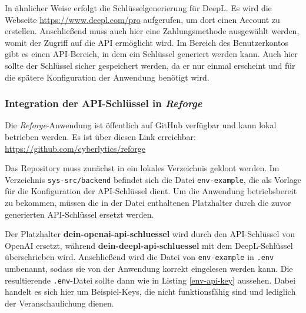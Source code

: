 In ähnlicher Weise erfolgt die Schlüsselgenerierung für DeepL. Es wird die Webseite \href{https://www.deepl.com/pro}{https://www.deepl.com/pro} aufgerufen, um dort einen Account zu erstellen. Anschließend muss auch hier eine Zahlungsmethode ausgewählt werden, womit der Zugriff auf die \ac{API} ermöglicht wird. Im Bereich des Benutzerkontos gibt es einen \ac{API}-Bereich, in dem ein Schlüssel generiert werden kann. Auch hier sollte der Schlüssel sicher gespeichert werden, da er nur einmal erscheint und für die spätere Konfiguration der Anwendung benötigt wird.

\subsubsection{Integration der \ac{API}-Schlüssel in \textit{Reforge}}

Die \textit{Reforge}-Anwendung ist öffentlich auf GitHub verfügbar und kann lokal betrieben werden. Es ist über diesen Link erreichbar: \href{https://github.com/cyberlytics/reforge}{https://github.com/cyberlytics/reforge}

Das Repository muss zunächst in ein lokales Verzeichnis geklont werden. Im Verzeichnis \texttt{sys-src/backend} befindet sich die Datei \texttt{env-example}, die als Vorlage für die Konfiguration der \ac{API}-Schlüssel dient. Um die Anwendung betriebsbereit zu bekommen, müssen die in der Datei enthaltenen Platzhalter durch die zuvor generierten \ac{API}-Schlüssel ersetzt werden.

Der Platzhalter \textbf{dein-openai-api-schluessel} wird durch den \ac{API}-Schlüssel von OpenAI ersetzt, während \textbf{dein-deepl-api-schluessel} mit dem DeepL-Schlüssel überschrieben wird. Anschließend wird die Datei von \texttt{env-example} in \texttt{.env} umbenannt, sodass sie von der Anwendung korrekt eingelesen werden kann. Die resultierende \texttt{.env}-Datei sollte dann wie in Listing \ref{env-api-key} aussehen. Dabei handelt es sich hier um Beispiel-Keys, die nicht funktionsfähig sind und lediglich der Veranschaulichung dienen.


